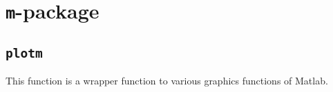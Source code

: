 

\chapter{\texttt{m}-package}

\section{\texttt{plotm}}\label{plotm}
This function is a wrapper function to various graphics functions of Matlab.


%
%
%
%
%
%
%
%
%
%

